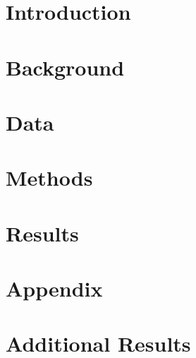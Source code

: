 \documentclass[11pt, english, letterpaper]{article}
\begin{document}
\newpage 

\newpage



\vspace{-5mm} \section{Introduction}
\label{sec:intro}


\section{Background}
\label{sec:background}


\section{Data}
\label{sec:data}


\section{Methods}
\label{sec:methods}


\section{Results}
\label{sec:results}


% 

\newpage

\printbibliography

\setcounter{page}{1}
\setcounter{table}{0}
\setcounter{figure}{0}
\setcounter{section}{0}
\renewcommand{\thetable}{\thesection\arabic{table}}
\renewcommand{\thefigure}{\thesection\arabic{figure}}
\renewcommand{\thepage}{\thesection\arabic{page}}
\renewcommand\thesection{\Alph{section}}
\renewcommand\thesubsection{\thesection.\arabic{subsection}}
\newpage
\section*{Appendix}
\section{Additional Results}


% 
\end{document}

